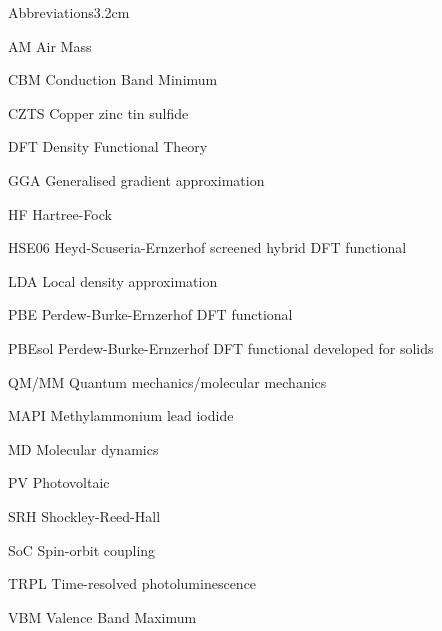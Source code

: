 \begin{mclistof}{Abbreviations}{3.2cm}

\item[AM] Air Mass
\item[CBM] Conduction Band Minimum
\item[CZTS] Copper zinc tin sulfide
\item[DFT] Density Functional Theory
\item[GGA] Generalised gradient approximation
\item[HF] Hartree-Fock
\item[HSE06] Heyd-Scuseria-Ernzerhof screened hybrid DFT functional 
\item[LDA] Local density approximation
\item[PBE] Perdew-Burke-Ernzerhof DFT functional
\item[PBEsol] Perdew-Burke-Ernzerhof DFT functional developed for solids
\item[QM/MM] Quantum mechanics/molecular mechanics
\item[MAPI] Methylammonium lead iodide
\item[MD] Molecular dynamics
\item[PV] Photovoltaic
\item[SRH] Shockley-Reed-Hall 
\item[SoC] Spin-orbit coupling
\item[TRPL] Time-resolved photoluminescence 
\item[VBM] Valence Band Maximum

\end{mclistof} 
